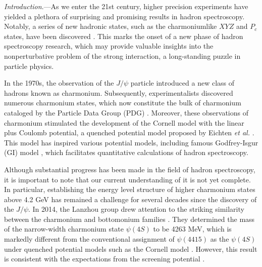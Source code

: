 \documentclass[prl,twocolumn,floatfix,amsmath,nofootinbib,amssymb,floatfix]{revtex4}
\begin{document}
\maketitle



{\noindent\it{Introduction}}.---As we enter the 21st century, higher precision experiments have yielded a plethora of surprising and promising results in hadron spectroscopy. Notably, a series of new hadronic states, such as the charmoniumlike $XYZ$ and $P_c$ states, have been discovered \cite{ParticleDataGroup:2020ssz,Chen:2016qju,Liu:2019zoy,Chen:2022asf,Guo:2017jvc,Olsen:2017bmm,Brambilla:2019esw}. This marks the onset of a new phase of hadron spectroscopy research, which may provide valuable insights into the nonperturbative problem of the strong interaction, a long-standing puzzle in particle physics.

In the 1970s, the observation of the $J/\psi$ particle \cite{E598:1974sol,SLAC-SP-017:1974ind} introduced a new class of hadrons known as charmonium. Subsequently, experimentalists discovered numerous charmonium states, which now constitute the bulk of charmonium cataloged by the Particle Data Group (PDG) \cite{ParticleDataGroup:2020ssz}. Moreover, these observations of charmonium stimulated the development of the Cornell model with the linear plus Coulomb potential, a quenched potential model proposed by Eichten {\it et al.} \cite{Eichten:1974af,Eichten:1978tg}. This model has inspired various potential models, including  famous Godfrey-Isgur (GI) model \cite{Godfrey:1985xj}, which facilitates quantitative calculations of hadron spectroscopy.

Although substantial progress has been made in the field of hadron spectroscopy, it is important to note that our current understanding of it is not yet complete. In particular, establishing the energy level structure of higher charmonium states above 4.2 GeV has remained a challenge for several decades since the discovery of the $J/\psi$. In 2014, the Lanzhou group drew attention to the striking similarity between the charmonium and bottomonium families \cite{He:2014xna}. They determined the mass of the narrow-width charmonium state $\psi(4S)$ to be 4263 MeV, which is markedly different from the conventional assignment of $\psi(4415)$ as the $\psi(4S)$ under quenched potential models such as the Cornell model \cite{Eichten:1974af,Eichten:1978tg}. However, this result is consistent with the expectations from the screening potential \cite{Dong:1994zj,Li:2009zu}.
\end{document}
